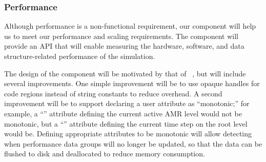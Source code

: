 \documentclass[10pt,twocolumn]{article}
\begin{document}
% 

\subsubsection{Performance} \label{sss:design-performance}

Although performance is a non-functional requirement, our
 component will help us to meet our performance and
scaling requirements.  The  component will provide
an API that will enable measuring the hardware, software, and data
structure-related performance of the simulation.

The design of the  component will be motivated by
that of ~\cite{wwwlcaperf}, but will include several
improvements.  One simple improvement will be to use opaque handles
for code regions instead of string constants to reduce overhead.  A
second improvement will be to support declaring a user attribute as
``monotonic;'' for example, a ``'' attribute defining the
current active AMR level would not be monotonic, but a
``'' attribute defining the current time step on the
root level would be.  Defining appropriate attributes to be monotonic
will allow detecting when performance data groups will no longer be
updated, so that the data can be flushed to disk and deallocated to
reduce memory consumption.
\end{document}
